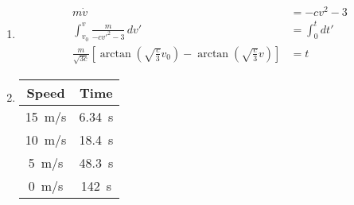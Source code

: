 \documentclass{article}
\begin{document}
\begin{enumerate}
  \item

        \begin{align*}
          m \dot{v}                                                                                                                       & = -c v^2 - 3    \\
          \int_{v_0}^v \frac{m}{-c v'^2 - 3} \,d v'                                                                                       & = \int_0^t d t' \\
          \frac{m}{\sqrt{3 c}} \left[ \arctan \left( \sqrt{\frac{c}{3}} v_0 \right) - \arctan \left( \sqrt{\frac{c}{3}} v \right) \right] & = t
        \end{align*}

  \item

        \begin{tabular}{c c}
          Speed         & Time          \\
          \hline
          \qty{15}{m/s} & \qty{6.34}{s} \\
          \qty{10}{m/s} & \qty{18.4}{s} \\
          \qty{5}{m/s}  & \qty{48.3}{s} \\
          \qty{0}{m/s}  & \qty{142}{s}
        \end{tabular}
\end{enumerate}

\setcounter{subsection}{40}
\subsection{}
\end{document}
